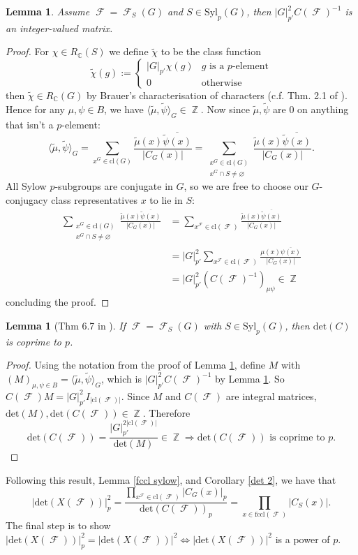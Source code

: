 \documentclass[12pt]{article}
\DeclareMathOperator{\C}{\mathbb{C}}
\DeclareMathOperator{\Z}{\mathbb{Z}}
\DeclareMathOperator{\sF}{\mathcal{F}}
\theoremstyle{plain}
\newtheorem{lem}[thm]{Lemma}
\theoremstyle{definition}
\begin{document}
\begin{lem}\label{integer-valued matrix}
Assume $\sF = \sF_S(G)$ and $S \in \mathrm{Syl}_p(G)$, then $|G|_{p'}^2C(\sF)^{-1}$ is an integer-valued matrix.
\end{lem}
\begin{proof}
For $\chi \in R_{\C}(S)$ we define $\tilde{\chi}$ to be the class function
\[\tilde{\chi}(g) := \begin{cases} |G|_{p'}\chi(g) & g \text{ is a $p$-element} \\ 0 & \text{otherwise} \end{cases}\]
then $\tilde{\chi} \in R_{\C}(G)$ by Brauer's characterisation of characters (c.f. Thm. 2.1 of \cite{serre}). Hence for any $\mu, \psi \in B$, we have $\langle \tilde{\mu}, \tilde{\psi} \rangle_{G} \in \Z$.
Now since $\tilde{\mu}, \tilde{\psi}$ are $0$ on anything that isn't a $p$-element:
\[\langle \tilde{\mu}, \tilde{\psi} \rangle_G = \sum_{x^G \in \text{cl}(G)} \frac{\tilde{\mu}(x)\overline{\tilde{\psi}(x)}}{|C_G(x)|} =\sum_{\substack{x^G \in \text{cl}(G) \\ x^G \cap S \neq \varnothing}}\frac{\tilde{\mu}(x)\overline{\tilde{\psi}(x)}}{|C_G(x)|}.\]
All Sylow $p$-subgroups are conjugate in $G$, so we are free to choose our $G$-conjugacy class representatives $x$ to lie in $S$:
\begin{align*} 
\sum_{\substack{x^G \in \text{cl}(G) \\ x^G \cap S \neq \varnothing}}\frac{\tilde{\mu}(x)\overline{\tilde{\psi}(x)}}{|C_G(x)|} &= \sum_{x^{\sF} \in \text{cl}(\sF)}\frac{\tilde{\mu}(x)\overline{\tilde{\psi}(x)}}{|C_G(x)|} 
 \\ &= |G|_{p'}^2 \sum_{x^{\sF} \in \text{cl}(\sF)}\frac{\mu(x)\overline{\psi(x)}}{|C_G(x)|} 
 \\ &= |G|_{p'}^2(C(\sF)^{-1})_{\mu\psi} \in \Z
\end{align*}
concluding the proof.
\end{proof}

\begin{lem}[Thm 6.7 in \cite{olsson}] \label{cartan coprime}
If $\sF = \sF_S(G)$ with $S \in \mathrm{Syl}_p(G)$, then $\mathrm{det}(C)$ is coprime to $p$.
\end{lem}
\begin{proof}
Using the notation from the proof of Lemma \ref{integer-valued matrix}, define $M$ with $(M)_{\mu, \psi \in B} = \langle \tilde{\mu}, \tilde{\psi} \rangle_G$, 
which is $|G|^2_{p'}C(\sF)^{-1}$ by Lemma \ref{integer-valued matrix}. 
So $C(\sF)M = |G|^2_{p'}I_{|\text{cl}(\sF)|}$. Since $M$ and $C(\sF)$ are integral matrices, $\mathrm{det}(M), \mathrm{det}(C(\sF)) \in \Z$. 
Therefore 
\[\mathrm{det}(C(\sF))= \frac{|G|_{p'}^{2|\text{cl}(\sF)|}}{\mathrm{det}(M)} \in \Z \Longrightarrow \mathrm{det}(C(\sF)) \text{ is coprime to } p.\]
\end{proof}
Following this result, Lemma \ref{fccl sylow}, and Corollary \ref{det 2}, we have that
\[|\mathrm{det}(X(\sF))|^2_p = \frac{\prod_{x^{\sF} \in \text{cl}(\sF)} |C_G(x)|_p}{\mathrm{det}(C(\sF))_p} = \prod_{x \in \text{fccl}(\sF)} |C_S(x)|.\]
The final step is to show $|\mathrm{det}(X(\sF))|^2_p = |\mathrm{det}(X(\sF))|^2 \iff |\mathrm{det}(X(\sF))|^2$ is a power of $p$. 
\end{document}
